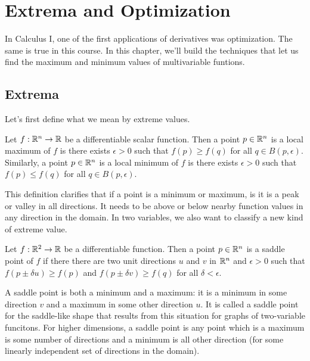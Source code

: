 \documentclass[fleqn,letterpaper]{report}
\begin{document}
\chapter{Extrema and Optimization}
\label{extrema-optimization}

In Calculus I, one of the first applications of derivatives
was optimization. The same is true in this course. In this
chapter, we'll build the techniques that let us find the
maximum and minimum values of multivariable funtions.

\section{Extrema}
\label{extrema}

Let's first define what we mean by extreme values.

\begin{defn}
Let $f: \mathbb{R}^n \rightarrow \mathbb{R}$ be a differentiable scalar
function.  Then a point $p \in \mathbb{R}^n$ is a local maximum of
$f$ is there exists $\epsilon > 0$ such that $f(p) \geq f(q)$
for all $q \in B(p, \epsilon)$. Similarly, a point $p \in
\mathbb{R}^n$ is a local minimum of $f$ is there exists $\epsilon >
0$ such that $f(p) \leq f(q)$ for all $q \in B(p, \epsilon)$.
\end{defn}

This definition clarifies that if a point is a minimum or
maximum, is it is a peak or valley in all directions. It needs
to be above or below nearby function values in any direction
in the domain. In two variables, we also want to classify
a new kind of extreme value.

\begin{defn}
\label{def-saddle-point}
Let $f: \mathbb{R}^2 \rightarrow \mathbb{R}$ be a differentiable function.
Then a point $p \in \mathbb{R}^n$ is a saddle point of $f$ if there
there are two unit directions $u$ and $v$ in $\mathbb{R}^n$ and
$\epsilon > 0$ such that $f(p \pm \delta u) \geq f(p)$ and
$f(p \pm \delta v) \geq f(q)$ for all $\delta < \epsilon$. 
\end{defn}

A saddle point is both a minimum and a maximum: it is a
minimum in some direction $v$ and a maximum in some other
direction $u$. It is called a saddle point for the
saddle-like shape that results from this situation for graphs
of two-variable funcitons. For higher dimensions, a saddle
point is any point which is a maximum is some number of
directions and a minimum is all other direction (for some
linearly independent set of directions in the domain). 
\end{document}
